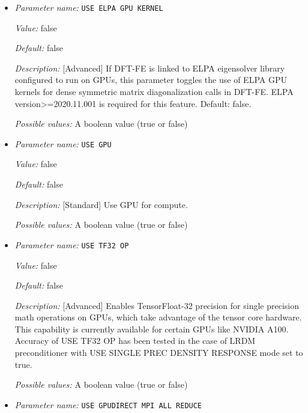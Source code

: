 \begin{itemize}
{\it Default:} true


{\it Description:} [Developer] Option to use full NxN memory on CPU in subspace rotation and when mixed precision optimization is not being used. This reduces the number of MPI\_Allreduce communication calls. Default: true.


{\it Possible values:} A boolean value (true or false)
\item {\it Parameter name:} {\tt USE ELPA GPU KERNEL}
\label{parameters:GPU/USE ELPA GPU KERNEL}
\label{parameters:GPU/USE_20ELPA_20GPU_20KERNEL}


{\it Value:} false


{\it Default:} false


{\it Description:} [Advanced] If DFT-FE is linked to ELPA eigensolver library configured to run on GPUs, this parameter toggles the use of ELPA GPU kernels for dense symmetric matrix diagonalization calls in DFT-FE. ELPA version>=2020.11.001 is required for this feature. Default: false.


{\it Possible values:} A boolean value (true or false)
\item {\it Parameter name:} {\tt USE GPU}
\label{parameters:GPU/USE GPU}
\label{parameters:GPU/USE_20GPU}


{\it Value:} false


{\it Default:} false


{\it Description:} [Standard] Use GPU for compute.


{\it Possible values:} A boolean value (true or false)
\item {\it Parameter name:} {\tt USE TF32 OP}
\label{parameters:GPU/USE TF32 OP}
\label{parameters:GPU/USE_20TF32_20OP}


{\it Value:} false


{\it Default:} false


{\it Description:} [Advanced] Enables TensorFloat-32 precision for single precision math operations on GPUs, which take advantage of the tensor core hardware. This capability is currently available for certain GPUs like NVIDIA A100. Accuracy of USE TF32 OP has been tested in the case of LRDM preconditioner with USE SINGLE PREC DENSITY RESPONSE mode set to true.


{\it Possible values:} A boolean value (true or false)
\item {\it Parameter name:} {\tt USE GPUDIRECT MPI ALL REDUCE}
\label{parameters:GPU/USE GPUDIRECT MPI ALL REDUCE}
\label{parameters:GPU/USE_20GPUDIRECT_20MPI_20ALL_20REDUCE}



\end{itemize}
